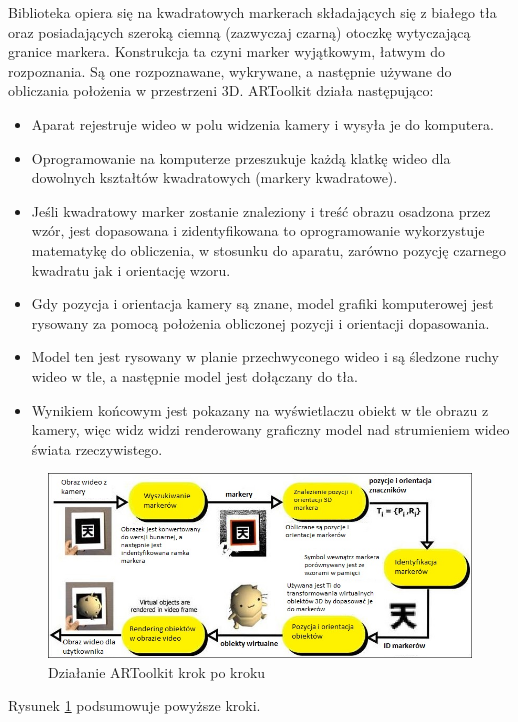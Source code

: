 Biblioteka opiera się na kwadratowych markerach składających się z białego tła oraz posiadających szeroką ciemną (zazwyczaj czarną) otoczkę wytyczającą granice markera. Konstrukcja ta czyni marker wyjątkowym, łatwym do rozpoznania. Są one rozpoznawane, wykrywane, a następnie używane do obliczania położenia w przestrzeni 3D. ARToolkit działa następująco:
\begin{itemize}
	\item Aparat rejestruje wideo w polu widzenia kamery i wysyła je do komputera.
	\item Oprogramowanie na komputerze przeszukuje każdą klatkę wideo dla dowolnych kształtów kwadratowych (markery kwadratowe).
	\item Jeśli kwadratowy marker zostanie znaleziony i treść obrazu osadzona przez wzór, jest dopasowana i zidentyfikowana to oprogramowanie wykorzystuje matematykę do obliczenia, w stosunku do aparatu, zarówno pozycję czarnego kwadratu jak i orientację wzoru.
	\item Gdy pozycja i orientacja kamery są znane, model grafiki komputerowej jest rysowany za pomocą położenia obliczonej pozycji i orientacji dopasowania.
	\item Model ten jest rysowany w planie przechwyconego wideo i są śledzone ruchy wideo w tle, a następnie model jest dołączany do tła.
	\item Wynikiem końcowym jest pokazany na wyświetlaczu obiekt w tle obrazu z kamery, więc widz widzi renderowany graficzny model nad strumieniem wideo świata rzeczywistego.
\end{itemize}

\begin{figure}[ht!]
\centering
\includegraphics[width=150mm]{diagram.jpg}
\caption{Działanie ARToolkit krok po kroku \label{artoolkitSteps}}
\end{figure}

Rysunek \ref{artoolkitSteps} podsumowuje powyższe kroki.
\bigskip

